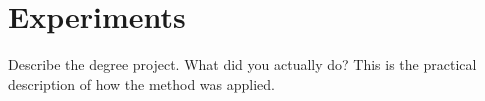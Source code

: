 \chapter{Experiments}
\label{chap:experiments}
Describe the degree project. What did you actually do? This is the practical description of how the method was applied.

